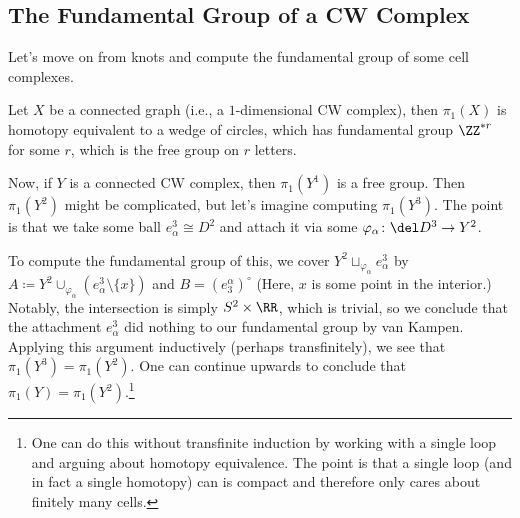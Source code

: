 \documentclass[../notes.tex]{subfiles}
\begin{document}
\subsection{The Fundamental Group of a CW Complex}
Let's move on from knots and compute the fundamental group of some cell complexes.
\begin{example}
	Let $X$ be a connected graph (i.e., a $1$-dimensional CW complex), then $\pi_1(X)$ is homotopy equivalent to a wedge of circles, which has fundamental group $\ZZ^{*r}$ for some $r$, which is the free group on $r$ letters.
\end{example}
Now, if $Y$ is a connected CW complex, then $\pi_1(Y^1)$ is a free group. Then $\pi_1(Y^2)$ might be complicated, but let's imagine computing $\pi_1(Y^3)$. The point is that we take some ball $e^3_\alpha\cong D^2$ and attach it via some $\varphi_\alpha\colon\del D^3\to Y^2$.

To compute the fundamental group of this, we cover $Y^2\sqcup_{\varphi_\alpha}e_\alpha^3$ by $A\coloneqq Y^2\cup_{\varphi_\alpha}(e^3_\alpha\setminus\{x\})$ and $B=(e_3^\alpha)^\circ$ (Here, $x$ is some point in the interior.) Notably, the intersection is simply $S^2\times\RR$, which is trivial, so we conclude that the attachment $e_\alpha^3$ did nothing to our fundamental group by van Kampen. Applying this argument inductively (perhaps transfinitely), we see that $\pi_1(Y^3)=\pi_1(Y^2)$. One can continue upwards to conclude that $\pi_1(Y)=\pi_1(Y^2)$.\footnote{One can do this without transfinite induction by working with a single loop and arguing about homotopy equivalence. The point is that a single loop (and in fact a single homotopy) can is compact and therefore only cares about finitely many cells.}
\end{document}
